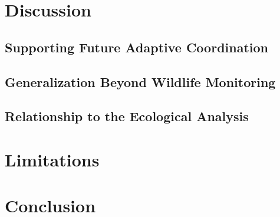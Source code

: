 \documentclass[manuscript]{acmart}
\begin{document}
\section{Discussion}
\label{sec:discussion}

\subsection{Supporting Future Adaptive Coordination}


\subsection{Generalization Beyond Wildlife Monitoring}


\subsection{Relationship to the Ecological Analysis}


\section{Limitations}
\label{sec:limitations}


\section{Conclusion}
\label{sec:conclusion}




\begin{acks}
\end{acks}
\\
\end{document}
